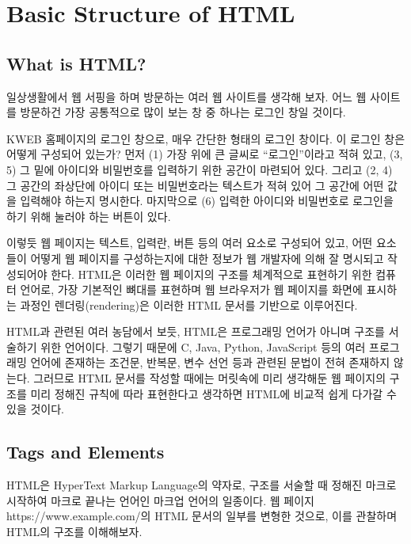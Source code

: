 \section{Basic Structure of HTML}\label{sect:basic-structure-of-html}

\subsection*{What is HTML?}

일상생활에서 웹 서핑을 하며 방문하는 여러 웹 사이트를 생각해 보자. 어느 웹 사이트를 방문하건 가장 공통적으로 많이 보는 창 중 하나는 로그인 창일 것이다.

    {}

\은 KWEB 홈페이지의 로그인 창으로, 매우 간단한 형태의 로그인 창이다. 이 로그인 창은 어떻게 구성되어 있는가? 먼저 (1) 가장 위에 큰 글씨로 ``로그인''이라고 적혀 있고, (3, 5) 그 밑에 아이디와 비밀번호를 입력하기 위한 공간이 마련되어 있다. 그리고 (2, 4) 그 공간의 좌상단에 아이디 또는 비밀번호라는 텍스트가 적혀 있어 그 공간에 어떤 값을 입력해야 하는지 명시한다. 마지막으로 (6) 입력한 아이디와 비밀번호로 로그인을 하기 위해 눌러야 하는 버튼이 있다.

이렇듯 웹 페이지는 텍스트, 입력란, 버튼 등의 여러 요소로 구성되어 있고, 어떤 요소들이 어떻게 웹 페이지를 구성하는지에 대한 정보가 웹 개발자에 의해 잘 명시되고 작성되어야 한다. HTML은 이러한 웹 페이지의 구조를 체계적으로 표현하기 위한 컴퓨터 언어로, 가장 기본적인 뼈대를 표현하며 웹 브라우저가 웹 페이지를 화면에 표시하는 과정인 렌더링(rendering)은 이러한 HTML 문서를 기반으로 이루어진다.

HTML과 관련된 여러 농담에서 보듯, HTML은 프로그래밍 언어가 아니며 구조를 서술하기 위한 언어이다. 그렇기 때문에 C, Java, Python, JavaScript 등의 여러 프로그래밍 언어에 존재하는 조건문, 반복문, 변수 선언 등과 관련된 문법이 전혀 존재하지 않는다. 그러므로 HTML 문서를 작성할 때에는 머릿속에 미리 생각해둔 웹 페이지의 구조를 미리 정해진 규칙에 따라 표현한다고 생각하면 HTML에 비교적 쉽게 다가갈 수 있을 것이다.

\subsection*{Tags and Elements}
HTML은 HyperText Markup Language의 약자로, 구조를 서술할 때 정해진 마크로 시작하여 마크로 끝나는 언어인 마크업 언어의 일종이다. \은 웹 페이지 https://www.example.com/의 HTML 문서의 일부를 변형한 것으로, 이를 관찰하며 HTML의 구조를 이해해보자.

